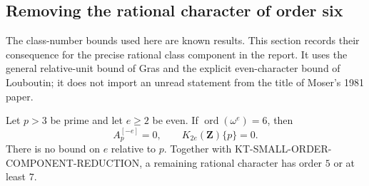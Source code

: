 \subsection{Removing the rational character of order six}
\label{sec:kt-order-six}

The class-number bounds used here are known results.  This section
records their consequence for the precise rational class component in
the report.  It uses the general relative-unit bound of Gras and the
explicit even-character bound of Louboutin; it does not import an
unread statement from the title of Moser's 1981 paper.

\begin{proposition}
Let $p>3$ be prime and let $e\ge2$ be even.  If
$\operatorname{ord}(\omega^e)=6$, then
\[
                 A_p^{[-e]}=0,
                 \qquad K_{2e}(\mathbf Z)\{p\}=0.       \tag{OS6.1}
\]
There is no bound on $e$ relative to $p$.
Together with KT-SMALL-ORDER-COMPONENT-REDUCTION, a remaining
rational character has order $5$ or at least $7$.
\end{proposition}

